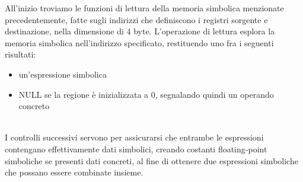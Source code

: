 \documentclass[Lau, oneside]{sapthesis}%
\begin{document}
All'inizio troviamo le funzioni di lettura della memoria simbolica menzionate precedentemente, fatte sugli indirizzi che definiscono i registri sorgente e destinazione, nella dimensione di 4 byte.
\newline
L'operazione di lettura esplora la memoria simbolica nell'indirizzo specificato, restituendo uno fra i seguenti risultati:
\begin{itemize}
    \item un'espressione simbolica
    \item NULL se la regione è inizializzata a 0, segnalando quindi un operando concreto
\end{itemize}
\ \\
I controlli successivi servono per assicurarsi che entrambe le espressioni contengano effettivamente dati simbolici, creando costanti floating-point simboliche se presenti dati concreti, al fine di ottenere due espressioni simboliche che possano essere combinate insieme.




\newpage
\end{document}
